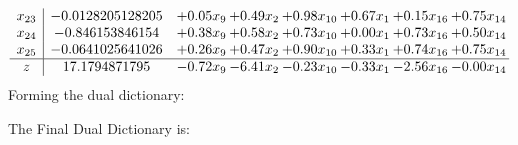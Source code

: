 \documentclass[8pt]{article}
\begin{document}
\[\begin{array}{c| c c@{\hskip 2pt} c@{\hskip 2pt} c@{\hskip 2pt} c@{\hskip 2pt} c@{\hskip 2pt} c@{\hskip 2pt} }
 x_{23}   &  -0.0128205128205 & +  0.05 x_{9} & +  0.49 x_{2} & +  0.98 x_{10} & +  0.67 x_{1} & +  0.15 x_{16} & +  0.75 x_{14}\\
 x_{24}   &  -0.846153846154 & +  0.38 x_{9} & +  0.58 x_{2} & +  0.73 x_{10} & +  0.00 x_{1} & +  0.73 x_{16} & +  0.50 x_{14}\\
 x_{25}   &  -0.0641025641026 & +  0.26 x_{9} & +  0.47 x_{2} & +  0.90 x_{10} & +  0.33 x_{1} & +  0.74 x_{16} & +  0.75 x_{14}\\
\hline
z    &  17.1794871795 & -0.72 x_{9} & -6.41 x_{2} & -0.23 x_{10} & -0.33 x_{1} & -2.56 x_{16} & -0.00 x_{14}\\
\end{array}\]
Forming the dual dictionary:

The Final Dual Dictionary is: 
\end{document}
